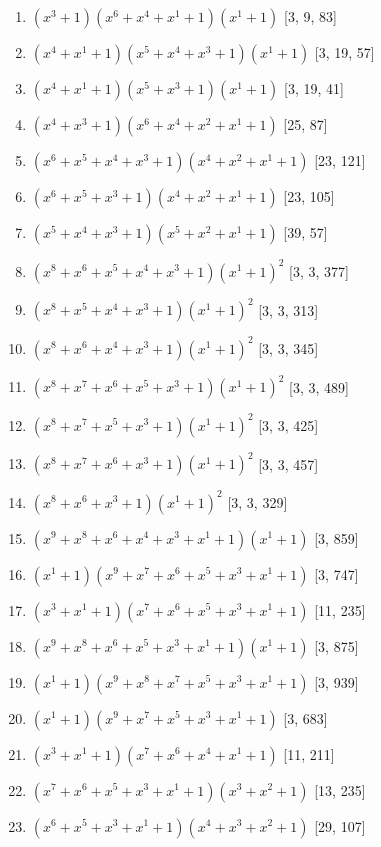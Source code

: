 \documentclass[10pt,twocolumn]{article}
\begin{document}
\begin{enumerate}
\item $(x^{3} + 1)(x^{6} + x^{4} + x^{1} + 1)(x^{1} + 1)$  [3, 9, 83]
\item $(x^{4} + x^{1} + 1)(x^{5} + x^{4} + x^{3} + 1)(x^{1} + 1)$  [3, 19, 57]
\item $(x^{4} + x^{1} + 1)(x^{5} + x^{3} + 1)(x^{1} + 1)$  [3, 19, 41]
\item $(x^{4} + x^{3} + 1)(x^{6} + x^{4} + x^{2} + x^{1} + 1)$  [25, 87]
\item $(x^{6} + x^{5} + x^{4} + x^{3} + 1)(x^{4} + x^{2} + x^{1} + 1)$  [23, 121]
\item $(x^{6} + x^{5} + x^{3} + 1)(x^{4} + x^{2} + x^{1} + 1)$  [23, 105]
\item $(x^{5} + x^{4} + x^{3} + 1)(x^{5} + x^{2} + x^{1} + 1)$  [39, 57]
\item $(x^{8} + x^{6} + x^{5} + x^{4} + x^{3} + 1)(x^{1} + 1)^{2}$  [3, 3, 377]
\item $(x^{8} + x^{5} + x^{4} + x^{3} + 1)(x^{1} + 1)^{2}$  [3, 3, 313]
\item $(x^{8} + x^{6} + x^{4} + x^{3} + 1)(x^{1} + 1)^{2}$  [3, 3, 345]
\item $(x^{8} + x^{7} + x^{6} + x^{5} + x^{3} + 1)(x^{1} + 1)^{2}$  [3, 3, 489]
\item $(x^{8} + x^{7} + x^{5} + x^{3} + 1)(x^{1} + 1)^{2}$  [3, 3, 425]
\item $(x^{8} + x^{7} + x^{6} + x^{3} + 1)(x^{1} + 1)^{2}$  [3, 3, 457]
\item $(x^{8} + x^{6} + x^{3} + 1)(x^{1} + 1)^{2}$  [3, 3, 329]
\item $(x^{9} + x^{8} + x^{6} + x^{4} + x^{3} + x^{1} + 1)(x^{1} + 1)$  [3, 859]
\item $(x^{1} + 1)(x^{9} + x^{7} + x^{6} + x^{5} + x^{3} + x^{1} + 1)$  [3, 747]
\item $(x^{3} + x^{1} + 1)(x^{7} + x^{6} + x^{5} + x^{3} + x^{1} + 1)$  [11, 235]
\item $(x^{9} + x^{8} + x^{6} + x^{5} + x^{3} + x^{1} + 1)(x^{1} + 1)$  [3, 875]
\item $(x^{1} + 1)(x^{9} + x^{8} + x^{7} + x^{5} + x^{3} + x^{1} + 1)$  [3, 939]
\item $(x^{1} + 1)(x^{9} + x^{7} + x^{5} + x^{3} + x^{1} + 1)$  [3, 683]
\item $(x^{3} + x^{1} + 1)(x^{7} + x^{6} + x^{4} + x^{1} + 1)$  [11, 211]
\item $(x^{7} + x^{6} + x^{5} + x^{3} + x^{1} + 1)(x^{3} + x^{2} + 1)$  [13, 235]
\item $(x^{6} + x^{5} + x^{3} + x^{1} + 1)(x^{4} + x^{3} + x^{2} + 1)$  [29, 107]

\end{enumerate}
\end{document}
